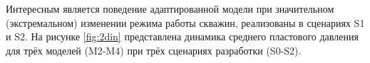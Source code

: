 \documentclass{article}
\begin{document}
Интересным является поведение адаптированной модели при значительном (экстремальном) изменении режима работы скважин, реализованы в сценариях S1 и S2. На рисунке \ref{fig:2din} представлена динамика среднего пластового давления для трёх моделей (M2-M4) при трёх сценариях разработки (S0-S2).
\begin{figure}
\end{figure}
\end{document}
